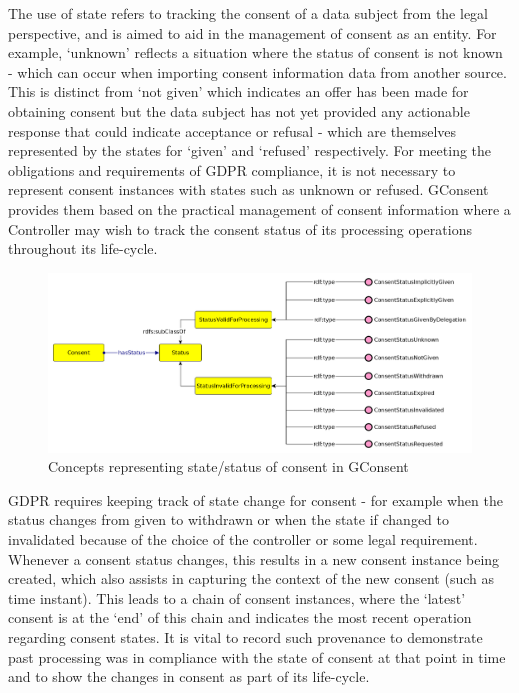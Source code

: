 The use of state refers to tracking the consent of a data subject from the legal perspective, and is aimed to aid in the management of consent as an entity. For example, `unknown' reflects a situation where the status of consent is not known - which can occur when importing consent information data from another source.
This is distinct from `not given' which indicates an offer has been made for obtaining consent but the data subject has not yet provided any actionable response that could indicate acceptance or refusal - which are themselves represented by the states for `given' and `refused' respectively.
For meeting the obligations and requirements of GDPR compliance, it is not necessary to represent consent instances with states such as unknown or refused.
GConsent provides them based on the practical management of consent information where a Controller may wish to track the consent status of its processing operations throughout its life-cycle.
\begin{figure}[htbp]
    \centering
    \includegraphics[width=\linewidth]{img/gconsent_status.png}
    \caption{Concepts representing state/status of consent in GConsent \cite{pandit_gconsent_2019}}
    \label{fig:vocabs:gconsent-status}
\end{figure}

GDPR requires keeping track of state change for consent - for example when the status changes from given to withdrawn or when the state if changed to invalidated because of the choice of the controller or some legal requirement. Whenever a consent status changes, this results in a new consent instance being created, which also assists in capturing the context of the new consent (such as time instant). This leads to a chain of consent instances, where the `latest' consent is at the `end' of this chain and indicates the most recent operation regarding consent states. It is vital to record such provenance to demonstrate past processing was in compliance with the state of consent at that point in time and to show the changes in consent as part of its life-cycle.

